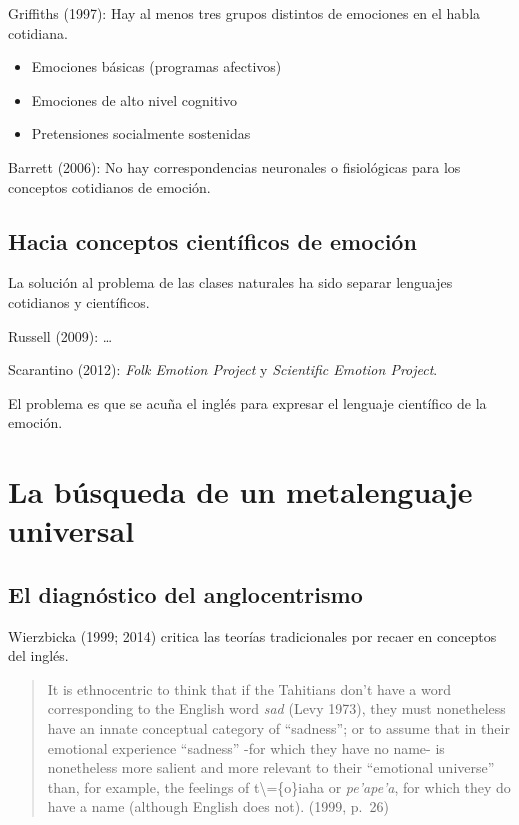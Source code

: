\documentclass{article}
\providecommand{\tightlist}{%
  \setlength{\itemsep}{0pt}\setlength{\parskip}{0pt}}
\begin{document}
Griffiths (1997): Hay al menos tres grupos distintos de emociones en el
habla cotidiana.

\begin{itemize}
\tightlist
\item
  Emociones básicas (programas afectivos)
\item
  Emociones de alto nivel cognitivo
\item
  Pretensiones socialmente sostenidas
\end{itemize}

Barrett (2006): No hay correspondencias neuronales o fisiológicas para
los conceptos cotidianos de emoción.

\subsection{Hacia conceptos científicos de
emoción}\label{hacia-conceptos-cientuxedficos-de-emociuxf3n}

La solución al problema de las clases naturales ha sido separar
lenguajes cotidianos y científicos.

Russell (2009): \ldots{}

Scarantino (2012): \emph{Folk Emotion Project} y \emph{Scientific
Emotion Project}.

El problema es que se acuña el inglés para expresar el lenguaje
científico de la emoción.

\section{La búsqueda de un metalenguaje
universal}\label{la-buxfasqueda-de-un-metalenguaje-universal}

\subsection{El diagnóstico del
anglocentrismo}\label{el-diagnuxf3stico-del-anglocentrismo}

Wierzbicka (1999; 2014) critica las teorías tradicionales por recaer en
conceptos del inglés.

\begin{quote}
It is ethnocentric to think that if the Tahitians don't have a word
corresponding to the English word \emph{sad} (Levy 1973), they must
nonetheless have an innate conceptual category of ``sadness''; or to
assume that in their emotional experience ``sadness'' -for which they
have no name- is nonetheless more salient and more relevant to their
``emotional universe'' than, for example, the feelings of
t\textbackslash=\{o\}iaha or \emph{pe'ape'a}, for which they do have a
name (although English does not). (1999, p.~26)
\end{quote}
\end{document}
